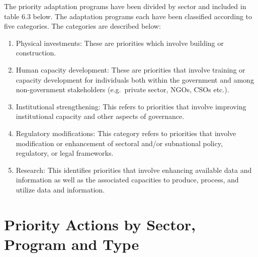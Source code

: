 \documentclass[
]{book}
\providecommand{\tightlist}{%
  \setlength{\itemsep}{0pt}\setlength{\parskip}{0pt}}
\begin{document}
The priority adaptation programs have been divided by sector and included in table 6.3 below. The adaptation programs each have been classified according to five categories. The categories are described below:

\begin{enumerate}
\def\labelenumi{\arabic{enumi}.}
\tightlist
\item
  Physical investments: These are priorities which involve building or construction.
\item
  Human capacity development: These are priorities that involve training or capacity development for individuals both within the government and among non-government stakeholders (e.g.~private sector, NGOs, CSOs etc.).\\
\item
  Institutional strengthening: This refers to priorities that involve improving institutional capacity and other aspects of governance.\\
\item
  Regulatory modifications: This category refers to priorities that involve modification or enhancement of sectoral and/or subnational policy, regulatory, or legal frameworks.\\
\item
  Research: This identifies priorities that involve enhancing available data and information as well as the associated capacities to produce, process, and utilize data and information.
\end{enumerate}

\hypertarget{priority-actions-by-sector-program-and-type}{%
\section{Priority Actions by Sector, Program and Type}\label{priority-actions-by-sector-program-and-type}}

\providecommand{\docline}[3]{\noalign{\global\setlength{\arrayrulewidth}{#1}}\arrayrulecolor[HTML]{#2}\cline{#3}}

\setlength{\tabcolsep}{2pt}

\renewcommand*{\arraystretch}{1.5}
\end{document}
